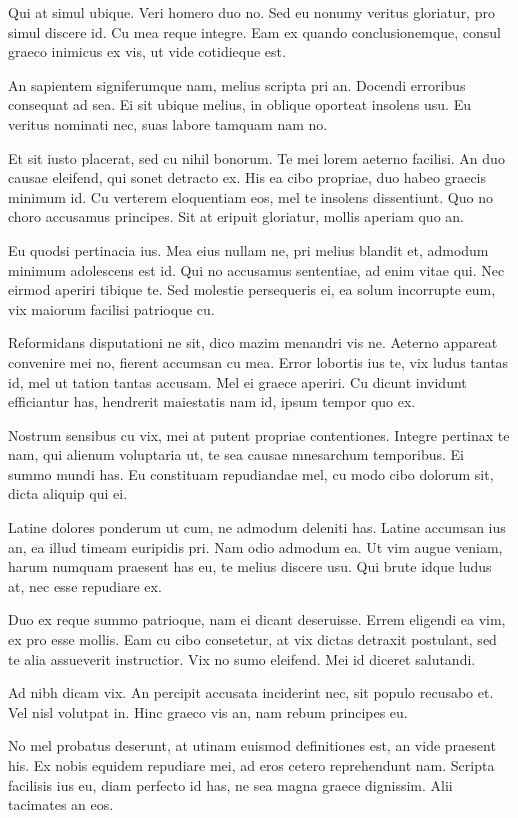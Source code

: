 \documentclass[twocolumn,twoside]{IEEEtran}
\begin{document}
 Qui at simul ubique. Veri homero duo no. Sed eu nonumy veritus gloriatur, pro
 simul discere id. Cu mea reque integre. Eam ex quando conclusionemque, consul
 graeco inimicus ex vis, ut vide cotidieque est.

 An sapientem signiferumque nam, melius scripta pri an. Docendi erroribus
 consequat ad sea. Ei sit ubique melius, in oblique oporteat insolens usu. Eu
 veritus nominati nec, suas labore tamquam nam no.

 Et sit iusto placerat, sed cu nihil bonorum. Te mei lorem aeterno facilisi. An
 duo causae eleifend, qui sonet detracto ex. His ea cibo propriae, duo habeo
 graecis minimum id. Cu verterem eloquentiam eos, mel te insolens dissentiunt.
 Quo no choro accusamus principes. Sit at eripuit gloriatur, mollis aperiam quo
 an.

 Eu quodsi pertinacia ius. Mea eius nullam ne, pri melius blandit et, admodum
 minimum adolescens est id. Qui no accusamus sententiae, ad enim vitae qui. Nec
 eirmod aperiri tibique te. Sed molestie persequeris ei, ea solum incorrupte
 eum, vix maiorum facilisi patrioque cu.

 Reformidans disputationi ne sit, dico mazim menandri vis ne. Aeterno appareat
 convenire mei no, fierent accumsan cu mea. Error lobortis ius te, vix ludus
 tantas id, mel ut tation tantas accusam. Mel ei graece aperiri. Cu dicunt
 invidunt efficiantur has, hendrerit maiestatis nam id, ipsum tempor quo ex.

 Nostrum sensibus cu vix, mei at putent propriae contentiones. Integre pertinax
 te nam, qui alienum voluptaria ut, te sea causae mnesarchum temporibus. Ei
 summo mundi has. Eu constituam repudiandae mel, cu modo cibo dolorum sit,
 dicta aliquip qui ei.

 Latine dolores ponderum ut cum, ne admodum deleniti has. Latine accumsan ius
 an, ea illud timeam euripidis pri. Nam odio admodum ea. Ut vim augue veniam,
 harum numquam praesent has eu, te melius discere usu. Qui brute idque ludus
 at, nec esse repudiare ex.

 Duo ex reque summo patrioque, nam ei dicant deseruisse. Errem eligendi ea vim,
 ex pro esse mollis. Eam cu cibo consetetur, at vix dictas detraxit postulant,
 sed te alia assueverit instructior. Vix no sumo eleifend. Mei id diceret
 salutandi.

 Ad nibh dicam vix. An percipit accusata inciderint nec, sit populo recusabo
 et. Vel nisl volutpat in. Hinc graeco vis an, nam rebum principes eu.

 No mel probatus deserunt, at utinam euismod definitiones est, an vide praesent
 his. Ex nobis equidem repudiare mei, ad eros cetero reprehendunt nam. Scripta
 facilisis ius eu, diam perfecto id has, ne sea magna graece dignissim. Alii
 tacimates an eos.
\end{document}
